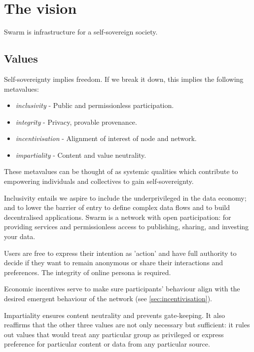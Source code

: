 \section{The vision  \statusorange}\label{sec:vision}


\begin{displayquote}
Swarm is infrastructure for a self-sovereign society. 
\end{displayquote}


\subsection{Values \statusorange}\label{sec:values}

Self-sovereignty implies freedom. If we break it down, this implies the following metavalues: 

\begin{itemize}
\item \emph{inclusivity} - Public and permissionless participation.  
\item \emph{integrity} - Privacy, provable provenance. 
\item \emph{incentivisation} - Alignment of interest of node and network.
\item \emph{impartiality} -  Content and value neutrality.  
\end{itemize}

These metavalues can be thought of as systemic qualities which contribute to empowering individuals and collectives to gain self-sovereignty.

Inclusivity entails we aspire to include the underprivileged in the data economy; and to lower the barrier of entry to define complex data flows and to build decentralised applications. Swarm is a network with open participation: for providing services and permissionless access to publishing, sharing, and investing your data.

Users are free to express their intention as 'action' and have full authority to decide if they want to remain anonymous or share their interactions and preferences. The integrity of online persona is required. 

Economic incentives serve to make sure participants' behaviour align with the desired emergent behaviour of the network (see \ref{sec:incentivisation}). 

Impartiality ensures content neutrality and prevents gate-keeping. It also reaffirms that the other three values are not only necessary but sufficient: it rules out values that would treat any particular group as privileged or express preference for particular content or data from any particular source. 


